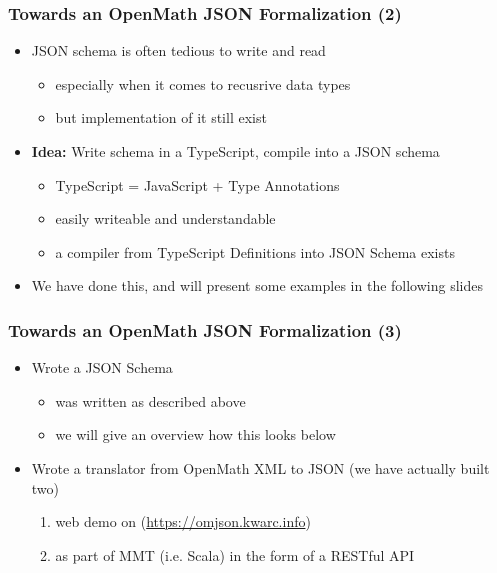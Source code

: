 \documentclass[usenames,dvipsnames]{beamer}
\begin{document}
\begin{frame}
    \frametitle{Towards an OpenMath JSON Formalization (2)}
    \begin{itemize}
        \item JSON schema is often tedious to write and read
        \begin{itemize}
            \item especially when it comes to recusrive data types
            \item but implementation of it still exist 
        \end{itemize}
        \item \textbf{Idea:} Write schema in a TypeScript, compile into a JSON schema
        \begin{itemize}
            \item TypeScript = JavaScript + Type Annotations
            \item easily writeable and understandable
            \item a compiler from TypeScript Definitions into JSON Schema exists
        \end{itemize}
        \item We have done this, and will present some examples in the following slides
    \end{itemize}
\end{frame}

\begin{frame}
    \frametitle{Towards an OpenMath JSON Formalization (3)}
    \begin{itemize}
        \item Wrote a JSON Schema
        \begin{itemize}
            \item was written as described above
            \item we will give an overview how this looks below
        \end{itemize}
        \item Wrote a translator from OpenMath XML to JSON (we have actually built two)
        \begin{enumerate}
            \item web demo on (\url{https://omjson.kwarc.info})
            \item as part of MMT (i.e. Scala) in the form of a RESTful API
        \end{enumerate}
    \end{itemize}
\end{frame}
\end{document}
